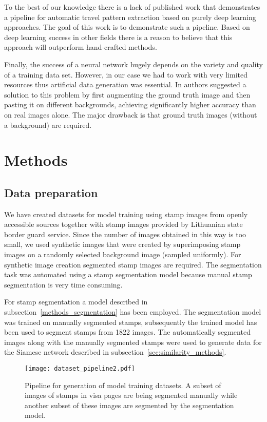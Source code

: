 \documentclass[twocolumn]{svjour3}
\begin{document}
To the best of our knowledge there is a lack of published work that demonstrates a pipeline for automatic travel pattern extraction based on purely deep learning approaches.
The goal of this work is to demonstrate such a pipeline.
Based on deep learning success in other fields there is a reason to believe that this approach will outperform hand-crafted methods.

Finally, the success of a neural network hugely depends on the variety and quality of a training data set. However, in our case we had to work with very limited resources thus artificial data generation was essential. In \cite{su_deep_2017} authors suggested a solution to this problem by first augmenting the ground truth image and then pasting it on different backgrounds, achieving significantly higher accuracy than on real images alone. The major drawback is that ground truth images (without a background) are required.

\section{Methods}
\label{methods}
\subsection{Data preparation}
\label{data_preparation_and_augmentation}

We have created datasets for model training using stamp images from openly accessible sources together with stamp images provided by Lithuanian state border guard service.
Since the number of images obtained in this way is too small, we used synthetic images that were created by superimposing stamp images on a randomly selected background image (sampled uniformly). For synthetic image creation segmented stamp images are required. The segmentation task was automated using a stamp segmentation model because manual stamp segmentation is very time consuming.

For stamp segmentation a model described in subsection~\ref{methods_segmentation} has been employed. The segmentation model was trained on manually segmented stamps, subsequently the trai\-ned model has been used to segment stamps from 1822 images. The automatically segmented images along with the manually segmented stamps were used to generate data for the Siamese network described in subsection~\ref{sec:similarity_methods}.

\begin{figure*}
    \centering
    \texttt{[image: dataset\_pipeline2.pdf]}
    \caption{
        Pipeline for generation of model training datasets.
        A subset of images of stamps in visa pages are being segmented manually while another subset of these images are segmented by the segmentation model.
    }
    \label{fig:datasets_pipeline}
\end{figure*}
\end{document}
